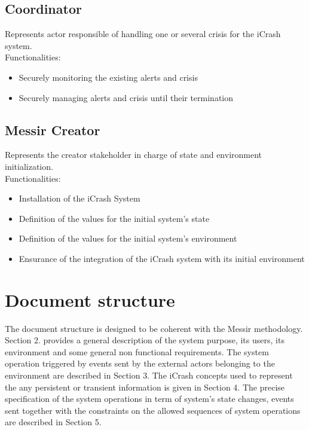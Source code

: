 \subsection{Coordinator}
Represents actor responsible of handling one or several crisis for the iCrash
system.\\
Functionalities:
\begin{itemize}
  \item Securely monitoring the existing alerts and crisis
  \item Securely managing alerts and crisis until their termination
\end{itemize}

\subsection{Messir Creator}
Represents the creator stakeholder in charge of state and environment
initialization.\\
Functionalities:
\begin{itemize}
  \item Installation of the iCrash System
  \item Definition of the values for the initial system’s state
  \item Definition of the values for the initial system’s environment
  \item Ensurance of  the integration of the iCrash system with its initial
  environment
\end{itemize}

\section{Document structure}
The document structure is designed to be coherent with the Messir methodology.
Section 2. provides a general description of the system purpose, its users, its
environment and some general non functional requirements. The system operation
triggered by events sent by the external actors belonging to the environment are
described in Section 3. The iCrash concepts used to represent the any persistent
or transient information is given in Section 4. The precise specification of the
system operations in term of system's state changes, events sent together with
the constraints on the allowed sequences of system operations are described in
Section 5.
